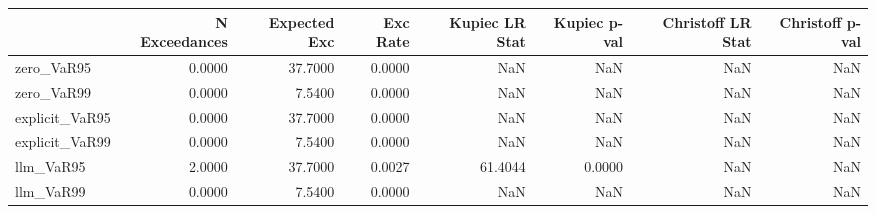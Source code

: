 \begin{tabular}{lrrrrrrr}
\toprule
 & N Exceedances & Expected Exc & Exc Rate & Kupiec LR Stat & Kupiec p-val & Christoff LR Stat & Christoff p-val \\
\midrule
zero_VaR95 & 0.0000 & 37.7000 & 0.0000 & NaN & NaN & NaN & NaN \\
zero_VaR99 & 0.0000 & 7.5400 & 0.0000 & NaN & NaN & NaN & NaN \\
explicit_VaR95 & 0.0000 & 37.7000 & 0.0000 & NaN & NaN & NaN & NaN \\
explicit_VaR99 & 0.0000 & 7.5400 & 0.0000 & NaN & NaN & NaN & NaN \\
llm_VaR95 & 2.0000 & 37.7000 & 0.0027 & 61.4044 & 0.0000 & NaN & NaN \\
llm_VaR99 & 0.0000 & 7.5400 & 0.0000 & NaN & NaN & NaN & NaN \\
\bottomrule
\end{tabular}
